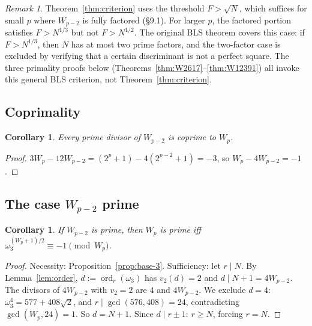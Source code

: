 \documentclass[12pt]{article}
\theoremstyle{plain}
\newtheorem{corollary}[theorem]{Corollary}
\theoremstyle{definition}
\theoremstyle{remark}
\newtheorem{remark}[theorem]{Remark}
\begin{document}
\begin{remark}\label{rem:bls-general}
Theorem~\ref{thm:criterion} uses the threshold \(F > \sqrt{N}\), which
suffices for small \(p\) where \(W_{p-2}\) is fully factored
(\S9.1). For larger \(p\), the factored portion satisfies
\(F > N^{1/3}\) but not \(F > N^{1/2}\). The original BLS theorem
\cite{ref3} covers this case: if \(F > N^{1/3}\), then \(N\) has at
most two prime factors, and the two-factor case is excluded by
verifying that a certain discriminant is not a perfect square.
The three primality proofs below (Theorems~\ref{thm:W2617}--\ref{thm:W12391})
all invoke this general BLS criterion, not Theorem~\ref{thm:criterion}.
\end{remark}

\subsection{Coprimality}


\begin{corollary}\label{cor:coprimality}
Every prime divisor of \(W_{p-2}\) is coprime
to \(W_p\).
\end{corollary}


\begin{proof}
\(3W_p - 12W_{p-2} = (2^p+1) - 4(2^{p-2}+1) = -3\), so
\(W_p - 4W_{p-2} = -1\).\end{proof}


\subsection{The case \texorpdfstring{\(W_{p-2}\)}{W\_\{p-2\}} prime}


\begin{corollary}\label{cor:Wp2-prime}
If \(W_{p-2}\) is prime, then
\(W_p\) is prime iff \(\omega_3^{(W_p+1)/2} \equiv -1 \pmod{W_p}\).
\end{corollary}


\begin{proof}
Necessity: Proposition~\ref{prop:base-3}. Sufficiency: let \(r \mid N\).
By Lemma~\ref{lem:order}, \(d := \operatorname{ord}_r(\omega_3)\) has
\(v_2(d) = 2\) and \(d \mid N + 1 = 4W_{p-2}\). The divisors of
\(4W_{p-2}\) with \(v_2 = 2\) are \(4\) and \(4W_{p-2}\). We exclude
\(d = 4\): \(\omega_3^4 = 577 + 408\sqrt{2}\), and
\(r \mid \gcd(576, 408) = 24\), contradicting
\(\gcd(W_p, 24) = 1\). So \(d = N + 1\). Since \(d \mid r \pm 1\):
\(r \geq N\), forcing \(r = N\).\end{proof}
\end{document}
